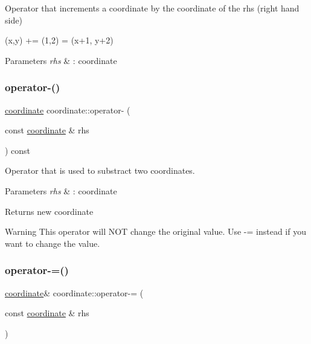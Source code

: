 Operator that increments a coordinate by the coordinate of the rhs (right hand side) 

(x,y) += (1,2) = (x+1, y+2) 
\begin{DoxyParams}{Parameters}
{\em rhs} & \+: coordinate \\
\hline
\end{DoxyParams}
\mbox{\label{classcoordinate_a6ffffa3a991bcbe09be645a8ed089624}} 
\subsubsection{\texorpdfstring{operator-\/()}{operator-()}}
{\footnotesize\ttfamily \hyperlink{classcoordinate}{coordinate} coordinate\+::operator-\/ (\begin{DoxyParamCaption}\item[{const \hyperlink{classcoordinate}{coordinate} \&}]{rhs }\end{DoxyParamCaption}) const\hspace{0.3cm}{\ttfamily [inline]}}



Operator that is used to substract two coordinates. 


\begin{DoxyParams}{Parameters}
{\em rhs} & \+: coordinate \\
\hline
\end{DoxyParams}
\begin{DoxyReturn}{Returns}
new coordinate 
\end{DoxyReturn}
\begin{DoxyWarning}{Warning}
This operator will N\+OT change the original value. Use -\/= instead if you want to change the value. 
\end{DoxyWarning}
\mbox{\label{classcoordinate_a0658bdeb9f68f6c5adc0608bc56966cb}} 
\subsubsection{\texorpdfstring{operator-\/=()}{operator-=()}}
{\footnotesize\ttfamily \hyperlink{classcoordinate}{coordinate}\& coordinate\+::operator-\/= (\begin{DoxyParamCaption}\item[{const \hyperlink{classcoordinate}{coordinate} \&}]{rhs }\end{DoxyParamCaption})\hspace{0.3cm}{\ttfamily [inline]}}



